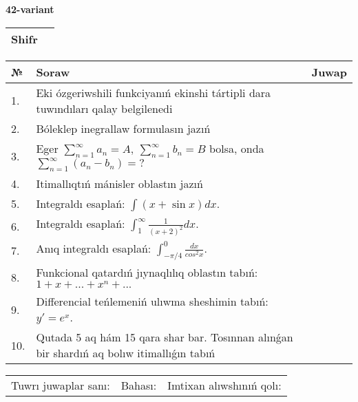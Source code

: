 \documentclass{article}
\begin{document}
  \egroup
  
  \newpage
  
  
  \textbf{42-variant}\\
  
  \bgroup
  \def\arraystretch{1.6} %
  
  \begin{tabular}{|m{5.7cm}|m{9.5cm}|}
  \hline
  Shifr & \\
  \hline
  \end{tabular}
  
  \vspace{1cm}
  
  \begin{tabular}{|m{0.7cm}|m{10cm}|m{4cm}|}
  \hline
  № & Soraw & Juwap \\
  \hline
  1. & Eki ózgeriwshili funkciyanıń ekinshi tártipli dara tuwındıları qalay belgilenedi &  \\
  \hline
  2. & Bóleklep inegrallaw formulasın jazıń &  \\
  \hline
  3. & Eger \(\sum_{n = 1}^{\infty}a_{n} = A,\ \sum_{n = 1}^{\infty}b_{n} = B\) bolsa, onda \(\sum_{n = 1}^{\infty}\left( a_{n} - b_{n} \right) = ?\) &  \\
  \hline
  4. & Itimallıqtıń mánisler oblastın jazıń &  \\
  \hline
  5. & Integraldı esaplań: \(\int{(x + \sin x)dx}\). &  \\
  \hline
  6. & Integraldı esaplań: \(\int_{1}^{\infty}{\frac{1}{(x + 2)^2 }dx}\). &  \\
  \hline
  7. & Anıq integraldı esaplań: \(\int_{- \pi/4}^{0}\frac{dx}{cos^2 x}\). &  \\
  \hline
  8. & Funkcional qatardıń jıynaqlılıq oblastın tabıń:\(1 + x + ... + x^{n} + ...\) &  \\
  \hline
  9. & Differencial teńlemeniń ulıwma sheshimin tabıń: \(y' = e^{x}\). &  \\
  \hline
  10. & Qutada 5 aq hám 15 qara shar bar. Tosınnan alınǵan bir shardıń aq bolıw itimallıǵın tabıń &  \\
  \hline
  \end{tabular}
  
  \vspace{1cm}
  
  \begin{tabular}{lll}
  Tuwrı juwaplar sanı: \underline{\hspace{1.5cm}} & 
  Bahası: \underline{\hspace{1.5cm}} & 
  Imtixan alıwshınıń qolı: \underline{\hspace{2cm}} \\
  \end{tabular}
  
\end{document}
